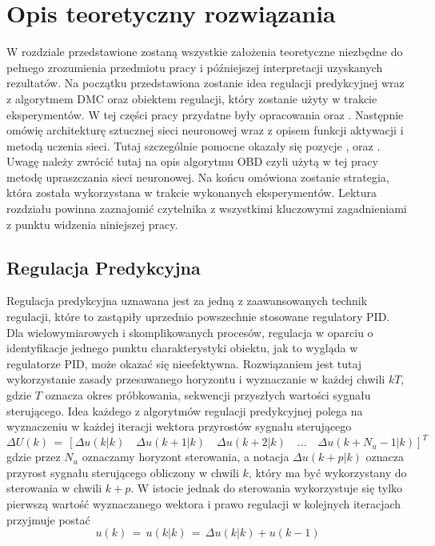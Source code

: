 \newpage %
\section{Opis teoretyczny rozwiązania}
W rozdziale przedstawione zostaną wszystkie założenia teoretyczne niezbędne do pełnego zrozumienia przedmiotu pracy i późniejszej interpretacji uzyskanych rezultatów. Na początku przedstawiona zostanie idea regulacji predykcyjnej wraz z algorytmem DMC oraz obiektem regulacji, który zostanie użyty w trakcie eksperymentów. W tej części pracy przydatne były opracowania \cite{stp2009} oraz \cite{tatjewski2016}. Następnie omówię architekturę sztucznej sieci neuronowej wraz z opisem funkcji aktywacji i metodą uczenia sieci. Tutaj szczególnie pomocne okazały się pozycje \cite{nielsen2015}, \cite{osowski2013} oraz \cite{wawrzynski2019}. Uwagę należy zwrócić tutaj na opis algorytmu OBD czyli użytą w tej pracy metodę upraszczania sieci neuronowej. Na końcu omówiona zostanie strategia, która została wykorzystana w trakcie wykonanych eksperymentów. Lektura rozdziału powinna zaznajomić czytelnika z wszystkimi kluczowymi zagadnieniami z punktu widzenia niniejszej pracy.

\subsection{Regulacja Predykcyjna}
Regulacja predykcyjna uznawana jest za jedną z zaawansowanych technik regulacji, które to zastąpiły uprzednio powszechnie stosowane regulatory PID. Dla wielowymiarowych i skomplikowanych procesów, regulacja w oparciu o identyfikacje jednego punktu charakterystyki obiektu, jak to wygląda w regulatorze PID, może okazać się nieefektywna. Rozwiązaniem jest tutaj wykorzystanie zasady przesuwanego horyzontu i wyznaczanie w każdej chwili $kT$, gdzie $T$ oznacza okres próbkowania, sekwencji przyszłych wartości sygnału sterującego. Idea każdego z algorytmów regulacji predykcyjnej polega na wyznaczeniu w każdej iteracji wektora przyrostów sygnału sterującego
\begin{equation}
\Delta U(k) \, = \, [\Delta u(k|k)\quad \Delta u(k+1|k)\quad \Delta u(k+2|k)\quad ... \quad \Delta u(k + N_u - 1|k)]^T
\end{equation}
gdzie przez \(N_u\) oznaczamy horyzont sterowania, a notacja \(\Delta u(k+p|k)\) oznacza przyrost sygnału sterującego obliczony w chwili \(k\), który ma być wykorzystany do sterowania w chwili \(k+p\). W istocie jednak do sterowania wykorzystuje się tylko pierwszą wartość wyznaczanego wektora i prawo regulacji w kolejnych iteracjach przyjmuje postać
\begin{equation}
u(k) \, = \, u(k|k) \, = \, \Delta u(k|k) + u(k-1)
\end{equation}

